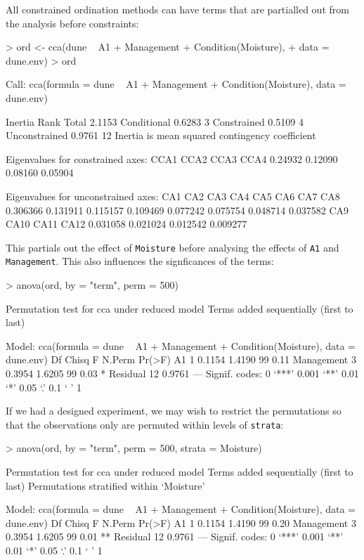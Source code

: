 \documentclass[a4paper,10pt]{amsart}
\begin{document}
All constrained ordination methods can have terms that are partialled
out from the analysis before constraints:
\begin{Schunk}
\begin{Sinput}
> ord <- cca(dune ~ A1 + Management + Condition(Moisture), 
+     data = dune.env)
> ord
\end{Sinput}
\begin{Soutput}
Call: cca(formula = dune ~ A1 + Management +
Condition(Moisture), data = dune.env)

              Inertia Rank
Total          2.1153     
Conditional    0.6283    3
Constrained    0.5109    4
Unconstrained  0.9761   12
Inertia is mean squared contingency coefficient 

Eigenvalues for constrained axes:
   CCA1    CCA2    CCA3    CCA4 
0.24932 0.12090 0.08160 0.05904 

Eigenvalues for unconstrained axes:
     CA1      CA2      CA3      CA4      CA5      CA6      CA7      CA8 
0.306366 0.131911 0.115157 0.109469 0.077242 0.075754 0.048714 0.037582 
     CA9     CA10     CA11     CA12 
0.031058 0.021024 0.012542 0.009277 
\end{Soutput}
\end{Schunk}
This partials out the effect of \texttt{Moisture} before analysing the
effects of \texttt{A1} and \texttt{Management}.  This also influences
the signficances of the terms:
\begin{Schunk}
\begin{Sinput}
> anova(ord, by = "term", perm = 500)
\end{Sinput}
\begin{Soutput}
Permutation test for cca under reduced model
Terms added sequentially (first to last)

Model: cca(formula = dune ~ A1 + Management + Condition(Moisture), data = dune.env)
           Df  Chisq      F N.Perm Pr(>F)  
A1          1 0.1154 1.4190     99   0.11  
Management  3 0.3954 1.6205     99   0.03 *
Residual   12 0.9761                       
---
Signif. codes:  0 ‘***’ 0.001 ‘**’ 0.01 ‘*’ 0.05 ‘.’ 0.1 ‘ ’ 1 
\end{Soutput}
\end{Schunk}
If we had a designed experiment, we may wish to restrict the
permutations so that the observations only are permuted within levels
of \texttt{strata}:
\begin{Schunk}
\begin{Sinput}
> anova(ord, by = "term", perm = 500, strata = Moisture)
\end{Sinput}
\begin{Soutput}
Permutation test for cca under reduced model
Terms added sequentially (first to last)
Permutations stratified within `Moisture'

Model: cca(formula = dune ~ A1 + Management + Condition(Moisture), data = dune.env)
           Df  Chisq      F N.Perm Pr(>F)   
A1          1 0.1154 1.4190     99   0.20   
Management  3 0.3954 1.6205     99   0.01 **
Residual   12 0.9761                        
---
Signif. codes:  0 ‘***’ 0.001 ‘**’ 0.01 ‘*’ 0.05 ‘.’ 0.1 ‘ ’ 1 
\end{Soutput}
\end{Schunk}

\end{document}
